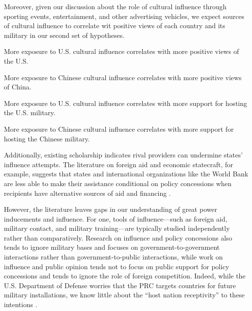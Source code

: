 Moreover, given our discussion about the role of cultural influence through sporting events, entertainment, and other advertising vehicles, we expect sources of cultural influence to correlate wit positive views of each country and its military in our second set of hypotheses.


\begin{subhyp}
	
	\begin{hyp}
		More exposure to U.S. cultural influence correlates with more positive views of the U.S.
	\end{hyp}
	
	\begin{hyp}
		More exposure to Chinese cultural influence correlates with more positive views of China.
	\end{hyp}
	
\end{subhyp}

\begin{subhyp}
	
	\begin{hyp}
		More exposure to U.S. cultural influence correlates with more support for hosting the U.S. military.
	\end{hyp}
	
	\begin{hyp}
		More exposure to Chinese cultural influence correlates with more support for hosting the Chinese military.
	\end{hyp}
	
\end{subhyp}

Additionally, existing scholarship indicates rival providers can undermine states' influence attempts. The literature on foreign aid and economic statecraft, for example, suggests that states and international organizations like the World Bank are less able to make their assistance conditional on policy concessions when recipients have alternative sources of aid and financing \cite{dunning2004,bdm2016,woods2008,kastner2021,watkins2022}. %


However, the literature leaves gaps in our understanding of great power inducements and influence. For one, tools of influence—such as foreign aid, military contact, and military training—are typically studied independently rather than comparatively. Research on influence and policy concessions also tends to ignore military bases and focuses on government-to-government interactions rather than government-to-public interactions, while work on influence and public opinion tends not to focus on public support for policy concessions and tends to ignore the role of foreign competition. Indeed, while the U.S. Department of Defense worries that the PRC targets countries for future military installations, we know little about the ``host nation receptivity'' to these intentions \cite{hudson2023}. %

